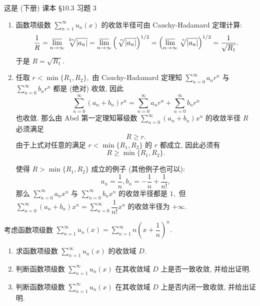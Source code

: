\begin{solution}
  这是 (下册) 课本 \S 10.3 习题 3

  \begin{enumerate}
    \item 函数项级数 $\sum\limits_{n=1}^{\infty} u_n(x)$ 的收敛半径可由 Cauchy-Hadamard 定理计算:
    $$\dfrac{1}{R} = \varlimsup_{n\to\infty} \nroot[2n]{\lvert a_{n} \rvert} = \varlimsup_{n\to\infty} \left( \nroot[n]{\lvert a_{n} \rvert} \right)^{1/2} = \left( \varlimsup_{n\to\infty} \nroot[n]{\lvert a_{n} \rvert} \right)^{1/2} = \dfrac{1}{\sqrt{R_1}}.$$
    于是 $R = \sqrt{R_1}.$
    \item 任取 $r < \min\{R_1, R_2\},$ 由 Cauchy-Hadamard 定理知 $\sum\limits_{n=0}^\infty a_n r^n$ 与 $\sum\limits_{n=0}^\infty b_n r^n$ 都是 (绝对) 收敛, 因此
    $$\sum\limits_{n=0}^\infty (a_n + b_n) r^n = \sum\limits_{n=0}^\infty a_n r^n + \sum\limits_{n=0}^\infty b_n r^n$$
    也收敛. 那么由 Abel 第一定理知幂级数 $\sum\limits_{n=0}^\infty (a_n + b_n) x^n$ 的收敛半径 $R$ 必须满足
    $$R \geqslant r.$$
    由于上式对任意的满足 $r < \min\{R_1, R_2\}$ 的 $r$ 都成立, 因此必须有 $$R \geqslant \min\{R_1, R_2\}.$$

    使得 $R > \min\{R_1, R_2\}$ 成立的例子 (其他例子也可以):
    $$a_n = \dfrac{1}{n}, b_n = -\dfrac{1}{n} + \dfrac{1}{n!},$$
    那么 $\sum\limits_{n=0}^\infty a_n x^n$ 与 $\sum\limits_{n=0}^\infty b_n x^n$ 的收敛半径都是 $1,$ 但 $\sum\limits_{n=0}^\infty (a_n + b_n) x^n = \sum\limits_{n=0}^\infty \dfrac{1}{n!} x^n$ 的收敛半径为 $+\infty.$
  \end{enumerate}
\end{solution}

\begin{question}[points = 10]
  考虑函数项级数 $\sum\limits_{n=1}^{\infty} u_n(x) = \sum\limits_{n=1}^{\infty} n \left( x + \dfrac{1}{n} \right)^n.$
  \begin{enumerate}
    \item 求函数项级数 $\sum\limits_{n=1}^{\infty} u_n(x)$ 的收敛域 $D.$
    \item 判断函数项级数 $\sum\limits_{n=1}^{\infty} u_n(x)$ 在其收敛域 $D$ 上是否一致收敛, 并给出证明.
    \item 判断函数项级数 $\sum\limits_{n=1}^{\infty} u_n(x)$ 在其收敛域 $D$ 上是否内闭一致收敛, 并给出证明.
  \end{enumerate}

\end{question}

